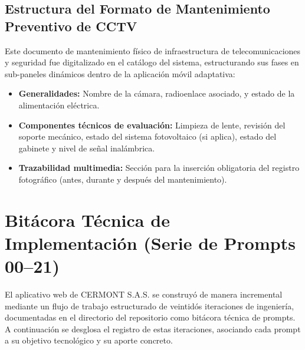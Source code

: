 \section{Estructura del Formato de Mantenimiento Preventivo de CCTV}
Este documento de mantenimiento físico de infraestructura de telecomunicaciones y seguridad fue digitalizado en el catálogo del sistema, estructurando sus fases en sub-paneles dinámicos dentro de la aplicación móvil adaptativa:
\begin{itemize}
    \item \textbf{Generalidades:} Nombre de la cámara, radioenlace asociado, y estado de la alimentación eléctrica.
    \item \textbf{Componentes técnicos de evaluación:} Limpieza de lente, revisión del soporte mecánico, estado del sistema fotovoltaico (si aplica), estado del gabinete y nivel de señal inalámbrica.
    \item \textbf{Trazabilidad multimedia:} Sección para la inserción obligatoria del registro fotográfico (antes, durante y después del mantenimiento).
\end{itemize}

\chapter{Bitácora Técnica de Implementación (Serie de Prompts 00--21)}
\label{apendice:bitacora-prompts}

El aplicativo web de CERMONT S.A.S. se construyó de manera incremental mediante un flujo de trabajo estructurado de veintidós iteraciones de ingeniería, documentadas en el directorio del repositorio como bitácora técnica de prompts. A continuación se desglosa el registro de estas iteraciones, asociando cada prompt a su objetivo tecnológico y su aporte concreto.


